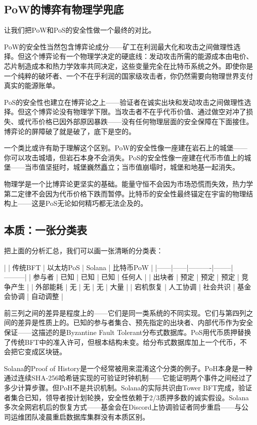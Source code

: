\documentclass[a4paper,12pt,openany]{ctexbook}
\begin{document}
\subsection*{PoW的博弈有物理学兜底}


让我们把PoW和PoS的安全性做一个最终的对比。

PoW的安全性当然包含博弈论成分——矿工在利润最大化和攻击之间做理性选择。但这个博弈论有一个物理学决定的硬底线：发动攻击所需的能源成本由电价、芯片制造成本和热力学效率共同决定，这些变量完全在比特币系统之外。即使你是一个纯粹的破坏者、一个不在乎利润的国家级攻击者，你仍然需要向物理世界支付真实的能源账单。

PoS的安全性也建立在博弈论之上——验证者在诚实出块和发动攻击之间做理性选择。但这个博弈论没有物理学下限。当攻击者不在乎代币价值、通过做空对冲了损失、或代币价格已因外部原因暴跌——没有任何物理层面的安全保障在下面接住。博弈论的屏障破了就是破了，底下是空的。

一个类比或许有助于理解这个区别。PoW的安全性像一座建在岩石上的城堡——你可以攻击城墙，但岩石本身不会消失。PoS的安全性像一座建在代币市值上的城堡——当市值坚挺时，城堡巍然矗立；当市值崩塌时，城堡和地基一起消失。

物理学是一个比博弈论更坚实的基础。能量守恒不会因为市场恐慌而失效，热力学第二定律不会因为代币价格下跌而暂停。比特币的安全性最终锚定在宇宙的物理结构上——这是PoS无论如何精巧都无法企及的。


\subsection*{本质：一张分类表}


把上面的分析汇总，我们可以画一张清晰的分类表：

|  | 传统BFT | 以太坊PoS | Solana | 比特币PoW |
|------|------|----------|--------|---------|
| 参与者 | 已知 | 已知 | 已知 | 任何人 |
| 出块者 | 预定 | 预定 | 预定 | 竞争产生 |
| 外部能耗 | 无 | 无 | 无 | 大量 |
| 宕机恢复 | 人工协调 | 社会共识 | 基金会协调 | 自动调整 |

前三列之间的差异是程度上的——它们是同一类系统的不同实现。它们与第四列之间的差异是性质上的。已知的参与者集合、预先指定的出块者、内部代币作为安全保证——这描述的是Byzantine Fault Tolerant分布式数据库。PoS用代币质押替换了传统BFT中的准入许可，但根本结构未变。给分布式数据库加上一个代币，不会把它变成区块链。

Solana的Proof of History是一个经常被用来混淆这个分类的例子。PoH本身是一种通过连续SHA-256哈希链实现的可验证时钟机制——它能证明两个事件之间经过了多少计算步骤。但PoH不是共识机制。Solana的实际共识由Tower BFT完成，验证者集合已知，领导者按计划轮换，安全性依赖于2/3质押多数的诚实假设。Solana多次全网宕机后的恢复方式——基金会在Discord上协调验证者同步重启——与公司运维团队凌晨重启数据库集群没有本质区别。
\end{document}
